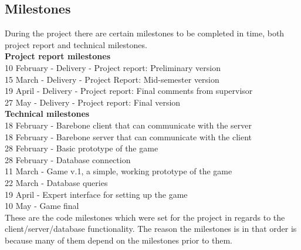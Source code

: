 \subsection{Milestones} 
During the project there are certain milestones to be completed in time, both project report and technical milestones. \\
\newline
\textbf{Project report milestones}\\
10 February - Delivery - Project report: Preliminary version\\
15 March - Delivery - Project Report: Mid-semester version\\
19 April - Delivery - Project report: Final comments from supervisor\\
27 May - Delivery - Project report: Final version\\
\newline
\textbf{Technical milestones} \\
18 February - Barebone client that can communicate with the server \\
18 February - Barebone server that can communicate with the client\\
28 February - Basic prototype of the game\\
28 February - Database connection\\
11 March - Game v.1, a simple, working prototype of the game\\
22 March - Database queries\\
19 April - Expert interface for setting up the game\\
10 May - Game final\\
\newline
These are the code milestones which were set for the project in regards to the 
client/server/database functionality. The reason the milestones is in that 
order is because many of them depend on the milestones prior to them. \\


